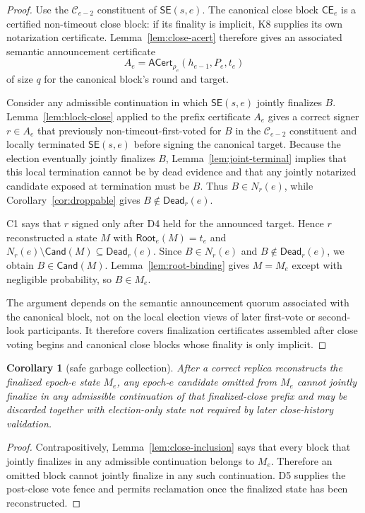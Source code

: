 \documentclass[11pt]{article}
\newtheorem{corollary}[theorem]{Corollary}
\theoremstyle{definition}
\theoremstyle{remark}
\newcommand{\C}{\mathcal C}
\newcommand{\SE}{\mathsf{SE}}
\newcommand{\CE}{\mathsf{CE}}
\newcommand{\Root}{\mathsf{Root}}
\newcommand{\Cand}{\mathsf{Cand}}
\newcommand{\ACert}{\mathsf{ACert}}
\newcommand{\Dead}{\mathsf{Dead}}
\begin{document}
\begin{proof}
Use the $\C_{e-2}$ constituent of $\SE(s,e)$. The canonical close block $\CE_e$ is a certified non-timeout close block: if its finality is implicit, K8 supplies its own notarization certificate. Lemma~\ref{lem:close-acert} therefore gives an associated semantic announcement certificate
\[
  A_e=\ACert_{\rho_e}(h_{e-1},P_e,t_e)
\]
of size $q$ for the canonical block's round and target.

Consider any admissible continuation in which $\SE(s,e)$ jointly finalizes $B$. Lemma~\ref{lem:block-close} applied to the prefix certificate $A_e$ gives a correct signer $r\in A_e$ that previously non-timeout-first-voted for $B$ in the $\C_{e-2}$ constituent and locally terminated $\SE(s,e)$ before signing the canonical target. Because the election eventually jointly finalizes $B$, Lemma~\ref{lem:joint-terminal} implies that this local termination cannot be by dead evidence and that any jointly notarized candidate exposed at termination must be $B$. Thus $B\in N_r(e)$, while Corollary~\ref{cor:droppable} gives $B\notin\Dead_r(e)$.

C1 says that $r$ signed only after D4 held for the announced target. Hence $r$ reconstructed a state $M$ with $\Root_e(M)=t_e$ and $N_r(e)\setminus\Cand(M)\subseteq\Dead_r(e)$. Since $B\in N_r(e)$ and $B\notin\Dead_r(e)$, we obtain $B\in\Cand(M)$. Lemma~\ref{lem:root-binding} gives $M=M_e$ except with negligible probability, so $B\in M_e$.

The argument depends on the semantic announcement quorum associated with the canonical block, not on the local election views of later first-vote or second-look participants. It therefore covers finalization certificates assembled after close voting begins and canonical close blocks whose finality is only implicit.
\end{proof}

\begin{corollary}[safe garbage collection]
\label{cor:gc}
After a correct replica reconstructs the finalized epoch-$e$ state $M_e$, any epoch-$e$ candidate omitted from $M_e$ cannot jointly finalize in any admissible continuation of that finalized-close prefix and may be discarded together with election-only state not required by later close-history validation.
\end{corollary}

\begin{proof}
Contrapositively, Lemma~\ref{lem:close-inclusion} says that every block that jointly finalizes in any admissible continuation belongs to $M_e$. Therefore an omitted block cannot jointly finalize in any such continuation. D5 supplies the post-close vote fence and permits reclamation once the finalized state has been reconstructed.
\end{proof}
\end{document}
